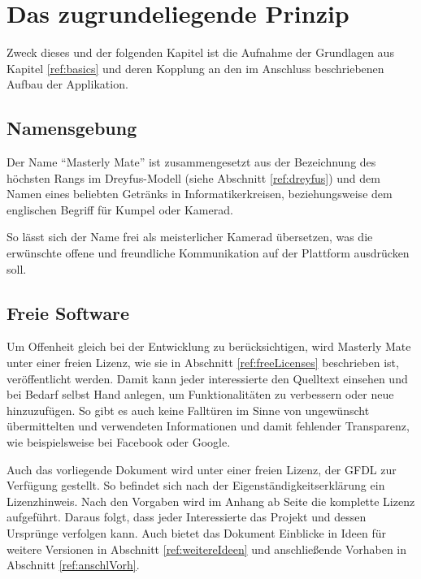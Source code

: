 
\chapter{Das zugrundeliegende Prinzip}
Zweck dieses und der folgenden Kapitel ist die Aufnahme der Grundlagen aus
Kapitel \ref{ref:basics} und deren Kopplung an den im Anschluss beschriebenen Aufbau der
Applikation.

\section{Namensgebung}\label{ref:naming}
Der Name "`Masterly Mate"' ist zusammengesetzt aus der Bezeichnung des höchsten
Rangs im Dreyfus-Modell (siehe Abschnitt \ref{ref:dreyfus}) und dem Namen eines
beliebten Getränks in Informatikerkreisen, beziehungsweise dem englischen
Begriff für Kumpel oder Kamerad.

So lässt sich der Name frei als meisterlicher Kamerad übersetzen, was die
erwünschte offene und freundliche Kommunikation auf der Plattform ausdrücken
soll.

\section{Freie Software}\label{ref:freeLicensesConcept}
Um Offenheit gleich bei der Entwicklung zu berücksichtigen, wird Masterly Mate
unter einer freien Lizenz, wie sie in Abschnitt \ref{ref:freeLicenses}
beschrieben ist, veröffentlicht werden. Damit kann jeder interessierte den
Quelltext einsehen und bei Bedarf selbst Hand anlegen, um Funktionalitäten zu
verbessern oder neue hinzuzufügen. So gibt es auch keine Falltüren im Sinne von
ungewünscht übermittelten und verwendeten Informationen und damit fehlender
Transparenz, wie beispielsweise bei Facebook oder Google.

Auch das vorliegende Dokument wird unter einer freien Lizenz, der \ac{GFDL} zur
Verfügung gestellt. So befindet sich nach der Eigenständigkeitserklärung ein
Lizenzhinweis. Nach den Vorgaben wird im Anhang ab Seite \pageref{ref:gfdl} die
komplette Lizenz aufgeführt. Daraus folgt, dass jeder Interessierte das Projekt
und dessen Ursprünge verfolgen kann. Auch bietet das Dokument Einblicke in Ideen
für weitere Versionen in Abschnitt \ref{ref:weitereIdeen} und anschließende
Vorhaben in Abschnitt \ref{ref:anschlVorh}.

